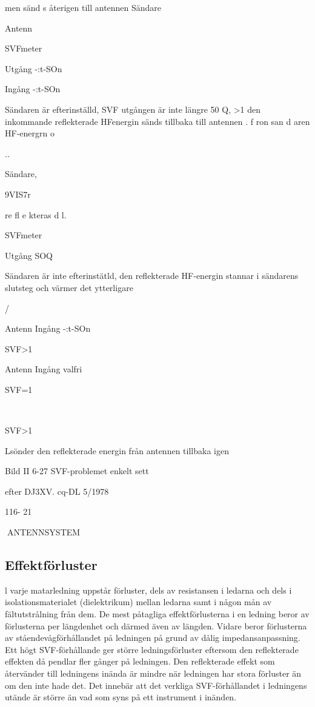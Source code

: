 men sänd s återigen till antennen
Sändare

Antenn

SVFmeter

Utgång
-:t-SOn

Ingång
-:t-SOn

Sändaren är efterinställd,
SVF
utgången är inte längre 50 Q,
>1
den inkommande reflekterade HFenergin sänds tillbaka till antennen
. f ron san d aren
HF-energrn
o

..

Sändare,\

9VIS7r

re fl e kteras d l.

SVFmeter

Utgång SOQ

Sändaren är inte efterinstätld,
den reflekterade HF-energin
stannar i sändarens slutsteg
och värmer det ytterligare

/

Antenn
Ingång
-:t-SOn

SVF>1

Antenn
Ingång
valfri

SVF=1

~

SVF>1

Lsönder den reflekterade energin
från antennen tillbaka igen

Bild II 6-27 SVF-problemet enkelt sett

efter DJ3XV. cq-DL 5/1978

116- 21

ANTENNSYSTEM
\subsection{Effektförluster}

l varje matarledning uppstår förluster, dels
av resistansen i ledarna och dels i isolationsmaterialet (dielektrikum) mellan ledarna samt i någon mån av fältutstrålning från
dem. De mest påtagliga effektförlusterna i
en ledning beror av förlusterna per längdenhet och därmed även av längden. Vidare
beror förlusterna av ståendevågförhållandet på ledningen på grund av dålig impedansanpassning.
Ett högt SVF-förhållande ger större ledningsförluster eftersom den reflekterade effekten då pendlar fler gånger på ledningen.
Den reflekterade effekt som återvänder till
ledningens inända är mindre när ledningen
har stora förluster än om den inte hade det.
Det innebär att det verkliga SVF-förhållandet i ledningens utände är större än vad som
syns på ett instrument i inänden.


